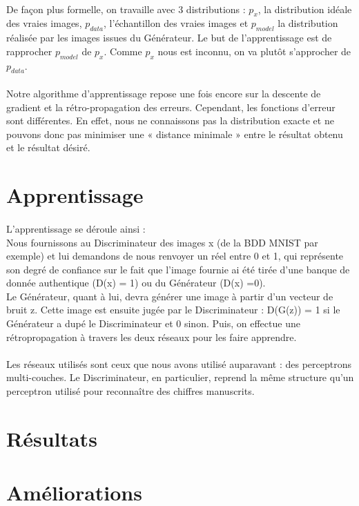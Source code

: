 \paragraph{}
De façon plus formelle, on travaille avec 3 distributions : $p_x$, la distribution idéale des vraies images, $p_{data}$, l’échantillon des vraies images et $p_{model}$ la distribution réalisée par les images issues du Générateur. Le but de l’apprentissage est de rapprocher $p_{model}$ de $p_x$. Comme $p_x$ nous est inconnu, on va plutôt s'approcher de $p_{data}$.

\paragraph{}
Notre algorithme d’apprentissage repose une fois encore sur la descente de gradient et la rétro-propagation des erreurs. Cependant, les fonctions d’erreur sont différentes. En effet, nous ne connaissons pas la distribution exacte et ne pouvons donc pas minimiser une « distance minimale » entre le résultat obtenu et le résultat désiré. 

\section{Apprentissage}
\paragraph{}
L’apprentissage se déroule ainsi :\\
Nous fournissons au Discriminateur des images x (de la BDD MNIST par exemple) et lui demandons de nous renvoyer un réel entre 0 et 1, qui représente son degré de confiance sur le fait que l’image fournie ai été tirée d’une banque de donnée authentique (D(x) = 1) ou du Générateur (D(x) =0).\\
Le Générateur, quant à lui, devra générer une image à partir d’un vecteur de bruit z. Cette image est ensuite jugée par le Discriminateur : D(G(z)) = 1 si le Générateur a dupé le Discriminateur et 0 sinon. Puis, on effectue une rétropropagation à travers les deux réseaux pour les faire apprendre.

\paragraph{}
Les réseaux utilisés sont ceux que nous avons utilisé auparavant : des perceptrons multi-couches. Le Discriminateur, en particulier, reprend la même structure qu’un perceptron utilisé pour reconnaître des chiffres manuscrits.

\section{Résultats}


\section{Améliorations}

